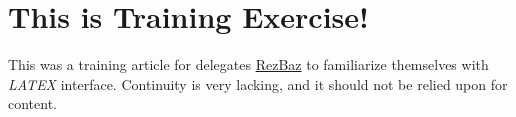 \section{This is Training Exercise!}
This was a training article for delegates \href{http://melbourne.resbaz.edu.au/}{RezBaz} to familiarize themselves with \textit{LATEX} interface. 
Continuity is very lacking, and it should not be relied upon for content. 